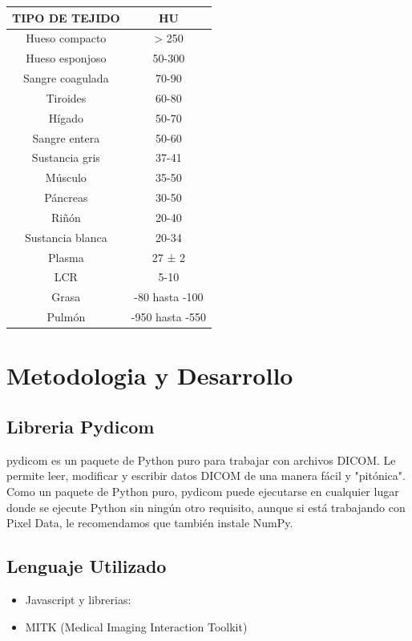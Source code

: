 \documentclass{article}
\begin{document}
\begin{table}[H]
\begin{center}
\begin{tabular}{| c | c |}
\hline
TIPO DE TEJIDO & HU \\ \hline
Hueso compacto & > 250 \\
Hueso esponjoso & 50-300 \\
Sangre coagulada & 70-90 \\
Tiroides & 60-80\\
Hígado & 50-70\\
Sangre entera & 50-60\\
Sustancia gris & 37-41\\
Músculo & 35-50\\
Páncreas & 30-50\\
Riñón & 20-40\\
Sustancia blanca & 20-34\\
Plasma & 27 ± 2\\
LCR & 5-10\\
Grasa & -80 hasta -100\\
Pulmón & -950 hasta -550\\ \hline
\end{tabular}
\end{center}
\end{table}


\section{Metodologia y Desarrollo}

\subsection{Libreria Pydicom}
pydicom es un paquete de Python puro para trabajar con archivos DICOM. Le permite leer, modificar y escribir datos DICOM de una manera fácil y "pitónica".
Como un paquete de Python puro, pydicom puede ejecutarse en cualquier lugar donde se ejecute Python sin ningún otro requisito, aunque si está trabajando con Pixel Data, le recomendamos que también instale NumPy.
\subsection{Lenguaje Utilizado}
\begin{itemize}
	\item Javascript y librerias:
	\item MITK (Medical Imaging Interaction Toolkit)
	\end{itemize}
	
\end{document}
